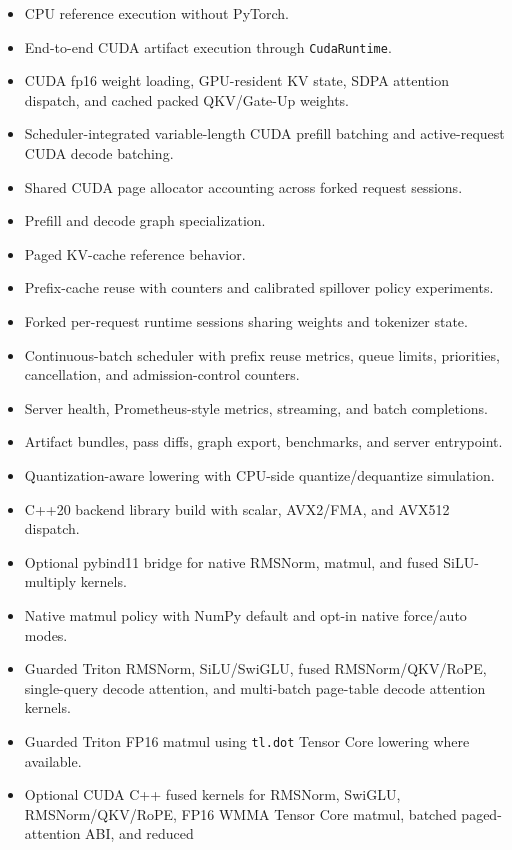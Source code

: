 \documentclass[11pt]{article}
\begin{document}
\begin{itemize}[leftmargin=*]
  \item CPU reference execution without PyTorch.
  \item End-to-end CUDA artifact execution through \texttt{CudaRuntime}.
  \item CUDA fp16 weight loading, GPU-resident KV state, SDPA attention dispatch,
        and cached packed QKV/Gate-Up weights.
  \item Scheduler-integrated variable-length CUDA prefill batching and
        active-request CUDA decode batching.
  \item Shared CUDA page allocator accounting across forked request sessions.
  \item Prefill and decode graph specialization.
  \item Paged KV-cache reference behavior.
  \item Prefix-cache reuse with counters and calibrated spillover policy experiments.
  \item Forked per-request runtime sessions sharing weights and tokenizer state.
  \item Continuous-batch scheduler with prefix reuse metrics, queue limits,
        priorities, cancellation, and admission-control counters.
  \item Server health, Prometheus-style metrics, streaming, and batch completions.
  \item Artifact bundles, pass diffs, graph export, benchmarks, and server
        entrypoint.
  \item Quantization-aware lowering with CPU-side quantize/dequantize simulation.
  \item C++20 backend library build with scalar, AVX2/FMA, and AVX512 dispatch.
  \item Optional pybind11 bridge for native RMSNorm, matmul, and fused
        SiLU-multiply kernels.
  \item Native matmul policy with NumPy default and opt-in native force/auto modes.
  \item Guarded Triton RMSNorm, SiLU/SwiGLU, fused RMSNorm/QKV/RoPE,
        single-query decode attention, and multi-batch page-table decode
        attention kernels.
  \item Guarded Triton FP16 matmul using \texttt{tl.dot} Tensor Core lowering
        where available.
  \item Optional CUDA C++ fused kernels for RMSNorm, SwiGLU, RMSNorm/QKV/RoPE,
        FP16 WMMA Tensor Core matmul, batched paged-attention ABI, and reduced

\end{itemize}
\end{document}

